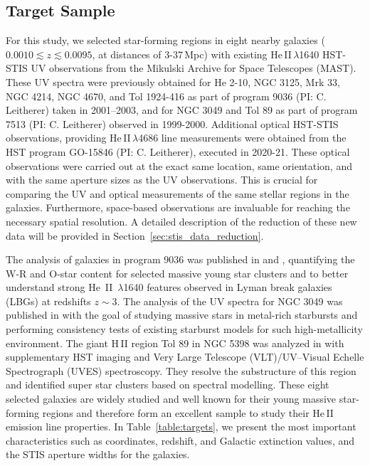\documentclass[linenumbers]{aastex63}
\begin{document}
\subsection{Target Sample}\label{ssect:sample}
For this study, we selected star-forming regions in eight nearby galaxies (${ 0.0010 \lesssim z \lesssim 0.0095}$, at distances of 3-37\,Mpc) with existing He\,II\,$\lambda$1640 HST-STIS UV observations from the Mikulski Archive for Space Telescopes (MAST). These UV spectra were previously obtained for He 2-10, NGC 3125, Mrk 33, NGC 4214, NGC 4670, and Tol 1924-416 as part of program 9036 (PI: C. Leitherer) taken in 2001–2003, and for NGC 3049 and Tol 89 as part of program 7513 (PI: C. Leitherer) observed in 1999-2000. 
Additional optical HST-STIS observations, providing He\,II\,$\lambda$4686 line measurements were obtained from the HST program GO-15846 (PI: C. Leitherer), executed in 2020-21. These optical observations were carried out at the exact same location, same orientation, and with the same aperture sizes as the UV observations. This is crucial for comparing the UV and optical measurements of the same stellar regions in the galaxies. Furthermore, space-based observations are invaluable for reaching the necessary spatial resolution. A detailed description of the reduction of these new data will be provided in Section~\ref{sec:stis_data_reduction}. 

The analysis of galaxies in program 9036 was published in \citet{chandar_ngc_2004} and \citet{chandar_stellar_2005}, quantifying the W-R and O-star content for selected massive young star clusters and to better understand strong He~II~$\lambda$1640 features observed in Lyman break galaxies (LBGs) at redshifts $z\sim3$.
The analysis of the UV spectra for NGC 3049 was published in \cite{gonzalez_delgado_massive_2002} with the goal of studying massive stars in metal-rich starbursts and performing consistency tests of existing starburst models for such high-metallicity environment.
The giant H\,II region Tol 89 in NGC 5398 was analyzed in \cite{sidoli_massive_2006} with supplementary HST imaging and Very Large Telescope (VLT)/UV–Visual Echelle Spectrograph (UVES) spectroscopy. They resolve the substructure of this region and identified super star clusters based on spectral modelling.  
These eight selected galaxies are widely studied and well known for their young massive star-forming regions and therefore form an excellent sample to study their He\,II emission line properties.
In Table~\ref{table:targets}, we present the most important characteristics such as coordinates, redshift, and Galactic extinction values, and the STIS aperture widths for the galaxies.

\end{document}
